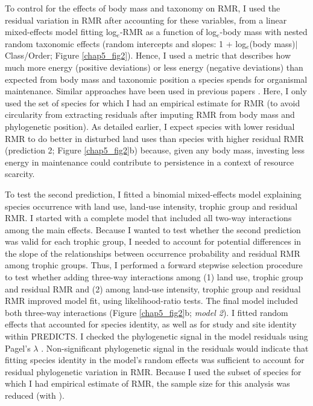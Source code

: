 To control for the effects of body mass and taxonomy on RMR, I used the residual variation in RMR after accounting for these variables, from a linear mixed-effects model fitting log$_e$-RMR as a function of log$_e$-body mass with nested random taxonomic effects (random intercepts and slopes: 1 + log$_e$(body mass)$\mid$Class/Order; Figure \ref{chap5_fig2}). Hence, I used a metric that describes how much more energy (positive deviations) or less energy (negative deviations) than expected from body mass and taxonomic position a species spends for organismal maintenance. Similar approaches have been used in previous papers \citep{Furness2008, Naya2013}. Here, I only used the set of species for which I had an empirical estimate for RMR (to avoid circularity from extracting residuals after imputing RMR from body mass and phylogenetic position). As detailed earlier, I expect species with lower residual RMR to do better in disturbed land uses than species with higher residual RMR (prediction 2; Figure \ref{chap5_fig2}b) because, given any body mass, investing less energy in maintenance could contribute to persistence in a context of resource scarcity. 

To test the second prediction, I fitted a binomial mixed-effects model explaining species occurrence with land use, land-use intensity, trophic group and residual RMR. I started with a complete model that included all two-way interactions among the main effects. Because I wanted to test whether the second prediction was valid for each trophic group, I needed to account for potential differences in the slope of the relationships between occurrence probability and residual RMR among trophic groups. Thus, I performed a forward stepwise selection procedure to test whether adding three-way interactions among (1) land use, trophic group and residual RMR and (2) among land-use intensity, trophic group and residual RMR improved model fit, using likelihood-ratio tests. The final model included both three-way interactions (Figure \ref{chap5_fig2}b; \textit{model 2}). I fitted random effects that accounted for species identity, as well as for study and site identity within PREDICTS. I checked the phylogenetic signal in the model residuals using Pagel’s $\lambda$ \citep{Pagel1999}. Non-significant phylogenetic signal in the residuals would indicate that fitting species identity in the model's random effects was sufficient to account for residual phylogenetic variation in RMR. Because I used the subset of species for which I had empirical estimate of RMR, the sample size for this analysis was reduced (with ).


